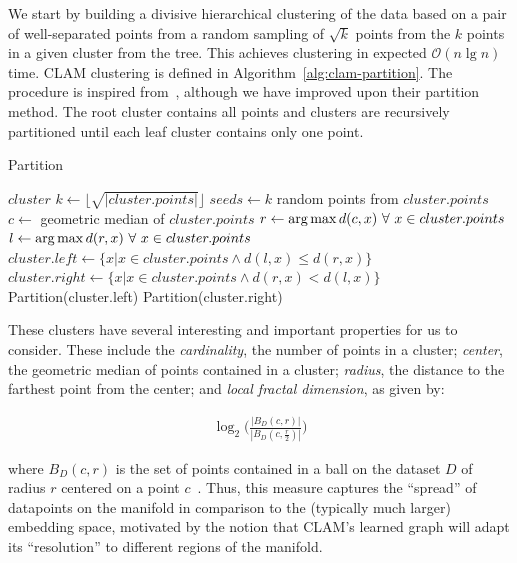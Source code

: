 We start by building a divisive hierarchical clustering of the data based on a pair of well-separated points from a random sampling of $\sqrt k$ points from the $k$ points in a given cluster from the tree.
This achieves clustering in expected $\mathcal{O}(n \lg n)$ time.
CLAM clustering is defined in Algorithm~\ref{alg:clam-partition}.
The procedure is inspired from~\cite{ishaq2019clustered}, although we have improved upon their partition method.
The root cluster contains all points and clusters are recursively partitioned until each leaf cluster contains only one point.

\begin{algorithm} %
\caption{Partition} %
\label{alg:clam-partition} %
\begin{algorithmic}[1] %
    \REQUIRE $cluster$
    \STATE $k \leftarrow \lfloor \sqrt{|cluster.points|} \rfloor$
    \STATE $seeds \leftarrow k$ random points from $cluster.points$
    \STATE $c \leftarrow$ geometric median of $cluster.points$
    \STATE $r \leftarrow \operatorname*{arg\,max} d(c,x) \ \forall \ x \in cluster.points$
    \STATE $l \leftarrow \operatorname*{arg\,max} d(r,x) \ \forall \ x \in cluster.points$
    \STATE $cluster.left \leftarrow \{x | x \in cluster.points \land d(l,x) \le d(r,x)\}$
    \STATE $cluster.right \leftarrow \{x | x \in cluster.points \land d(r,x) < d(l,x)\}$
        \STATE Partition(cluster.left)
    \ENDIF
        \STATE Partition(cluster.right)
    \ENDIF
\end{algorithmic}
\end{algorithm}

These clusters have several interesting and important properties for us to consider.
These include the \textit{cardinality}, the number of points in a cluster;
\textit{center}, the geometric median of points contained in a cluster;
\textit{radius}, the distance to the farthest point from the center;
and \textit{local fractal dimension},
as given by:

\begin{gather}
    \log_2\bigg(\frac{|B_D(c, r)|}{|B_D(c, \frac{r}{2})|}\bigg)
    \label{fractal-dimension}
\end{gather}

where $B_D(c,r)$ is the set of points contained in a ball on the dataset $D$ of radius $r$ centered on a point $c$~\cite{ishaq2019clustered}.
Thus, this measure captures the ``spread'' of datapoints on the manifold in comparison to the (typically much larger) embedding space, motivated by the notion that CLAM's learned graph will adapt its ``resolution'' to different regions of the manifold.

